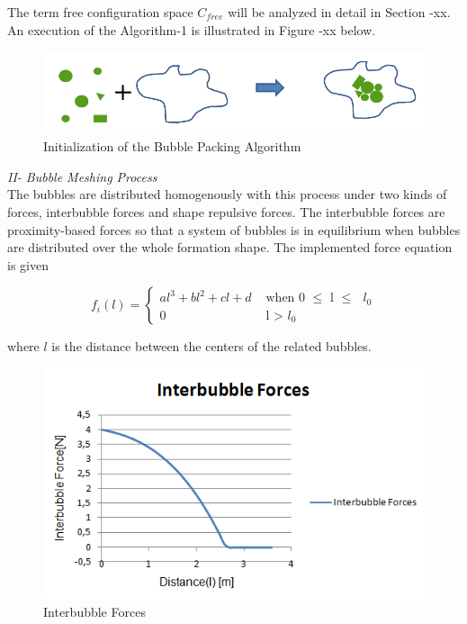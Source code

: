 The term free configuration space $C_{free}$ will be analyzed in detail in Section -xx. An execution of the Algorithm-1 is illustrated in Figure -xx below.
		
\begin{figure}[H]
\caption{Initialization of the Bubble Packing Algorithm}
\centering
\includegraphics[scale = 0.50]{bubble_packing}
\end{figure}
				
\textit{			II- Bubble Meshing Process } \\ 
The bubbles are distributed homogenously with this process under two kinds of forces, interbubble forces and shape repulsive forces. The interbubble forces are proximity-based forces so that a system of bubbles is in equilibrium when bubbles are distributed over the whole formation shape. The implemented force equation is given
		
\begin{equation}
f_i(l) = \left\{ \begin{array}{rl}
al^3 + bl^2 + cl + d &\mbox{ when 0 $\leq$ l $\leq$ $l_0$} \\
0                               &\mbox{ l > $l_0$}
\end{array} \right.
\end{equation}

where $l$ is the distance between the centers of the related bubbles. 

\begin{figure}[H]
\caption{Interbubble Forces}
\centering
\includegraphics[scale = 0.70]{interbubble_forces}
\end{figure}
	
